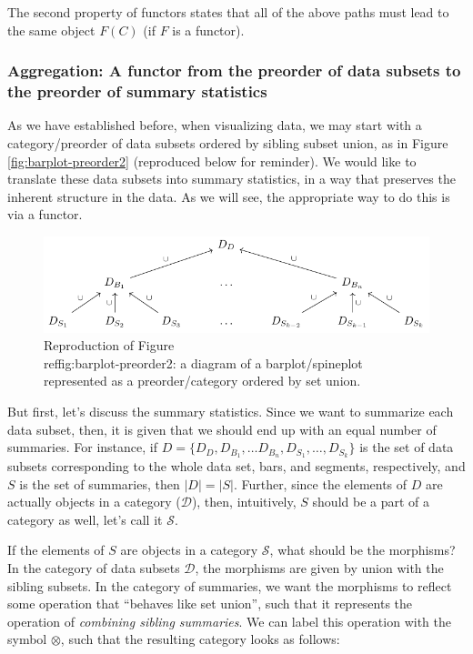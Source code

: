 \documentclass[
]{book}
\theoremstyle{definition}
\theoremstyle{definition}
\theoremstyle{definition}
\theoremstyle{definition}
\theoremstyle{remark}
\begin{document}
The second property of functors states that all of the above paths must lead to the same object \(F(C)\) (if \(F\) is a functor).

\subsubsection{Aggregation: A functor from the preorder of data subsets to the preorder of summary statistics}\label{aggregation-functor}

As we have established before, when visualizing data, we may start with a category/preorder of data subsets ordered by sibling subset union, as in Figure \ref{fig:barplot-preorder2} (reproduced below for reminder). We would like to translate these data subsets into summary statistics, in a way that preserves the inherent structure in the data. As we will see, the appropriate way to do this is via a functor.

\begin{figure}

{\centering \includegraphics[width=1\linewidth,height=1\textheight]{./figures/barplot-preorder2} 

}

\caption{Reproduction of Figure \\ref{fig:barplot-preorder2}: a diagram of a barplot/spineplot represented as a preorder/category ordered by set union.}\label{fig:barplot-preorder22}
\end{figure}

But first, let's discuss the summary statistics. Since we want to summarize each data subset, then, it is given that we should end up with an equal number of summaries. For instance, if \(D = \{ D_D, D_{B_1}, \ldots D_{B_n}, D_{S_1}, \ldots, D_{S_k} \}\) is the set of data subsets corresponding to the whole data set, bars, and segments, respectively, and \(S\) is the set of summaries, then \(\lvert D \lvert = \lvert S \lvert\). Further, since the elements of \(D\) are actually objects in a category (\(\mathcal{D}\)), then, intuitively, \(S\) should be a part of a category as well, let's call it \(\mathcal{S}\).

If the elements of \(S\) are objects in a category \(\mathcal{S}\), what should be the morphisms? In the category of data subsets \(\mathcal{D}\), the morphisms are given by union with the sibling subsets. In the category of summaries, we want the morphisms to reflect some operation that ``behaves like set union'', such that it represents the operation of \emph{combining sibling summaries}. We can label this operation with the symbol \(\otimes\), such that the resulting category looks as follows:
\end{document}
